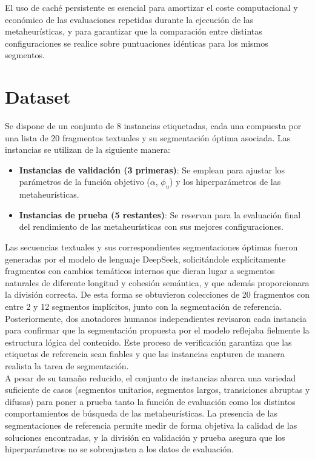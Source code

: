 \documentclass[letterpaper, 12pt]{report}
\begin{document}
El uso de caché persistente es esencial para amortizar el coste computacional y económico de las evaluaciones repetidas durante la ejecución de las metaheurísticas, y para garantizar que la comparación entre distintas configuraciones se realice sobre puntuaciones idénticas para los mismos segmentos.

\section{Dataset}

Se dispone de un conjunto de 8 instancias etiquetadas, cada una compuesta por una lista de 20 fragmentos textuales y su segmentación óptima asociada. Las instancias se utilizan de la siguiente manera:

\begin{itemize}
    \item \textbf{Instancias de validación (3 primeras)}: Se emplean para ajustar los parámetros de la función objetivo (\(\alpha\), \(\phi_u\)) y los hiperparámetros de las metaheurísticas.
    \item \textbf{Instancias de prueba (5 restantes)}: Se reservan para la evaluación final del rendimiento de las metaheurísticas con sus mejores configuraciones.
\end{itemize}

Las secuencias textuales y sus correspondientes segmentaciones óptimas fueron generadas por el modelo de lenguaje DeepSeek, solicitándole explícitamente fragmentos con cambios temáticos internos que dieran lugar a segmentos naturales de diferente longitud y cohesión semántica, y que además proporcionara la división correcta. De esta forma se obtuvieron colecciones de 20 fragmentos con entre 2 y 12 segmentos implícitos, junto con la segmentación de referencia. Posteriormente, dos anotadores humanos independientes revisaron cada instancia para confirmar que la segmentación propuesta por el modelo reflejaba fielmente la estructura lógica del contenido. Este proceso de verificación garantiza que las etiquetas de referencia sean fiables y que las instancias capturen de manera realista la tarea de segmentación. \\


A pesar de su tamaño reducido, el conjunto de instancias abarca una variedad suficiente de casos (segmentos unitarios, segmentos largos, transiciones abruptas y difusas) para poner a prueba tanto la función de evaluación como los distintos comportamientos de búsqueda de las metaheurísticas. La presencia de las segmentaciones de referencia permite medir de forma objetiva la calidad de las soluciones encontradas, y la división en validación y prueba asegura que los hiperparámetros no se sobreajusten a los datos de evaluación. \\
\end{document}
